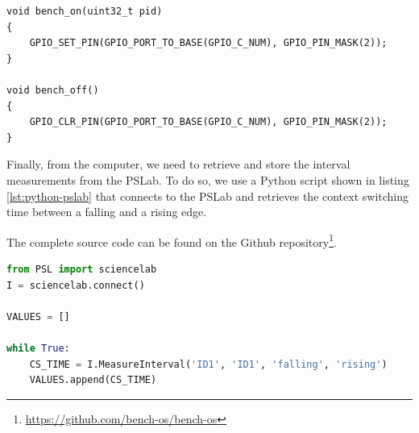 \begin{lstlisting}[style=CStyle, caption={\texttt{bench\_on()} and \texttt{bench\_off()} implementation in Contiki}, label={lst:external-on-off-code}]
void bench_on(uint32_t pid)
{
    GPIO_SET_PIN(GPIO_PORT_TO_BASE(GPIO_C_NUM), GPIO_PIN_MASK(2));
}

void bench_off()
{
    GPIO_CLR_PIN(GPIO_PORT_TO_BASE(GPIO_C_NUM), GPIO_PIN_MASK(2));
}
\end{lstlisting}

Finally, from the computer, we need to retrieve and store the interval measurements from the PSLab.
To do so, we use a Python script shown in listing \ref{lst:python-pslab} that connects to the PSLab and retrieves the context switching time between a falling and a rising edge.

The complete source code can be found on the Github repository\footnote{\url{https://github.com/bench-os/bench-os}}.

\begin{lstlisting}[style=CStyle, language=python, caption={Python script to communicate with the PSLab and retrieve the interval measurements}, label={lst:python-pslab}]
from PSL import sciencelab
I = sciencelab.connect()

VALUES = []

while True:
    CS_TIME = I.MeasureInterval('ID1', 'ID1', 'falling', 'rising')
    VALUES.append(CS_TIME)
\end{lstlisting}